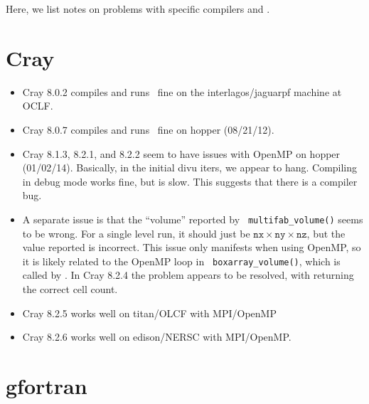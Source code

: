 Here, we list notes on problems with specific compilers and \maestro.


\section{Cray}

\begin{itemize}
\item Cray 8.0.2 compiles and runs \maestro\ fine on the interlagos/jaguarpf 
machine at OCLF.
\item Cray 8.0.7 compiles and runs \maestro\ fine on hopper (08/21/12).

\item Cray 8.1.3, 8.2.1, and 8.2.2 seem to have issues with OpenMP on hopper 
 (01/02/14).  Basically, in the initial divu iters, we appear to hang.
 Compiling in debug mode works fine, but is slow.  This suggests that
 there is a compiler bug.
 
 \item A separate issue is that the ``volume'' reported by {\tt
 multifab\_volume()} seems to be wrong.  For a single level run, it
 should just be $\mathtt{nx} \times \mathtt{ny} \times \mathtt{nz}$,
 but the value reported is incorrect.  This issue only manifests when
 using OpenMP, so it is likely related to the OpenMP loop in {\tt
 boxarray\_volume()}, which is called by .
 In Cray 8.2.4 the problem appears to be resolved, with  
  returning the correct cell count.

\item Cray 8.2.5 works well on titan/OLCF with MPI/OpenMP
\item Cray 8.2.6 works well on edison/NERSC with MPI/OpenMP.

\end{itemize}


\section{gfortran}

